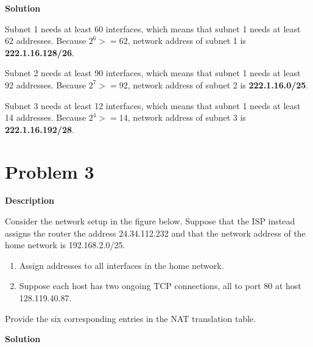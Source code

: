 \documentclass[12pt,letterpaper]{ctexart}
\begin{document}
{\bf Solution}

Subnet 1 needs at least 60 interfaces, which means that subnet 1 needs at least 62 addresses. Because $2^6 >= 62$, network address of subnet 1 is \textbf{222.1.16.128/26}.

Subnet 2 needs at least 90 interfaces, which means that subnet 1 needs at least 92 addresses. Because $2^7 >= 92$, network address of subnet 2 is \textbf{222.1.16.0/25}.

Subnet 3 needs at least 12 interfaces, which means that subnet 1 needs at least 14 addresses. Because $2^4 >= 14$, network address of subnet 3 is \textbf{222.1.16.192/28}.

\newpage

\section*{Problem 3}

{\bf Description}

Consider the network setup in the figure below. Suppose that the ISP instead assigns the
router the address 24.34.112.232 and that the network address of the home network is
192.168.2.0/25.

\begin{enumerate}
  \item Assign addresses to all interfaces in the home network.
  \item Suppose each host has two ongoing TCP connections, all to port 80 at host 128.119.40.87.
\end{enumerate}

Provide the six corresponding entries in the NAT translation table.

{\bf Solution}
\end{document}
